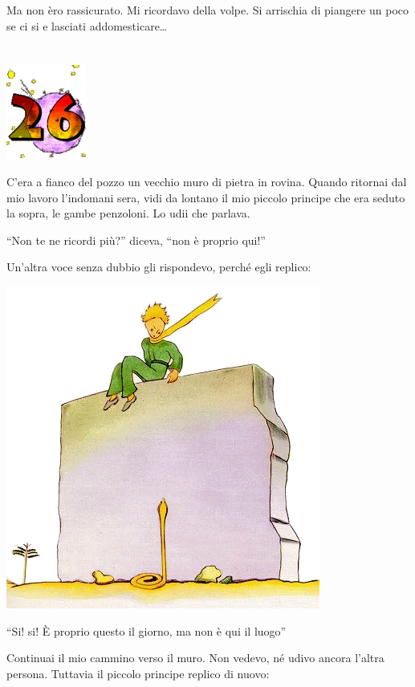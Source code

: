 \documentclass[11pt]{scrbook}
\begin{document}
Ma non èro rassicurato. Mi ricordavo della volpe. Si arrischia di
piangere un poco se ci si e lasciati addomesticare\ldots{}

\chapter{}
\begin{center}
\includegraphics{./img/chapter26.png}
\end{center}

C'era a fianco del pozzo un vecchio muro di pietra in rovina. Quando
ritornai dal mio lavoro l'indomani sera, vidi da lontano il mio piccolo
principe che era seduto la sopra, le gambe penzoloni. Lo udii che
parlava.

``Non te ne ricordi più?'' diceva, ``non è proprio qui!''

Un'altra voce senza dubbio gli rispondevo, perché egli replico:

\begin{center}
\includegraphics{./img/26a.png}
\end{center}

``Si! si! È proprio questo il giorno, ma non è qui il luogo''

Continuai il mio cammino verso il muro. Non vedevo, né udivo ancora
l'altra persona. Tuttavia il piccolo principe replico di nuovo:
\end{document}
